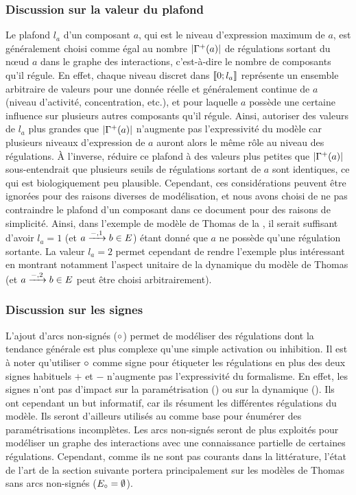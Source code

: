 \subsubsection*{Discussion sur la valeur du plafond}
\label{plafond}
Le plafond $l_a$ d'un composant $a$, qui est le niveau d'expression maximum de $a$,
est généralement choisi comme égal au nombre $|\mathrm{\Gamma}^+(a)|$
de régulations sortant du nœud $a$ dans le graphe des interactions,
c'est-à-dire le nombre de composants qu'il régule.
En effet, chaque niveau discret dans $\mathopen{\llbracket}0\mathclose{};l_a\mathclose{\rrbracket}$ représente un ensemble arbitraire de valeurs
pour une donnée réelle et généralement continue de $a$ (niveau d'activité, concentration, etc.),
et pour laquelle $a$ possède une certaine influence sur plusieurs autres composants qu'il régule.
Ainsi, autoriser des valeurs de $l_a$ plus grandes que $|\mathrm{\Gamma}^+(a)|$
n'augmente pas l'expressivité du modèle
car plusieurs niveaux d'expression de $a$ auront alors le même rôle au niveau des régulations.
À l'inverse, réduire ce plafond à des valeurs plus petites que $|\mathrm{\Gamma}^+(a)|$
sous-entendrait que plusieurs seuils de régulations sortant de $a$ sont identiques,
ce qui est biologiquement peu plausible.
Cependant, ces considérations peuvent être ignorées pour des raisons diverses de modélisation,
et nous avons choisi de ne pas contraindre le plafond d'un composant dans ce document
pour des raisons de simplicité.
Ainsi, dans l'exemple de modèle de Thomas de la ,
il serait suffisant d'avoir $l_a = 1$ (et $a \xrightarrow{-, 1} b \in E$)
étant donné que $a$ ne possède qu'une régulation sortante.
La valeur $l_a = 2$ permet cependant de rendre l'exemple plus intéressant
en montrant notamment l'aspect unitaire de la dynamique du modèle de Thomas
(et $a \xrightarrow{-, 2} b \in E$ peut être choisi arbitrairement).

\subsubsection*{Discussion sur les signes}
L'ajout d'arcs non-signés ($\circ$) permet de modéliser des régulations dont la tendance générale
est plus complexe qu'une simple activation ou inhibition.
Il est à noter qu'utiliser $\circ$ comme signe pour étiqueter les régulations en plus
des deux signes habituels $+$ et $-$ n'augmente pas l'expressivité du formalisme.
En effet, les signes n'ont pas d'impact sur la paramétrisation ()
ou sur la dynamique ().
Ils ont cependant un but informatif, car ils résument les différentes régulations du modèle.
Ils seront d'ailleurs utilisés au 
comme base pour énumérer des paramétrisations incomplètes.
Les arcs non-signés seront de plus exploités pour modéliser un graphe des interactions
avec une connaissance partielle de certaines régulations.
Cependant, comme ils ne sont pas courants dans la littérature,
l'état de l'art de la section suivante portera principalement
sur les modèles de Thomas sans arcs non-signés ($E_\circ = \emptyset$).

